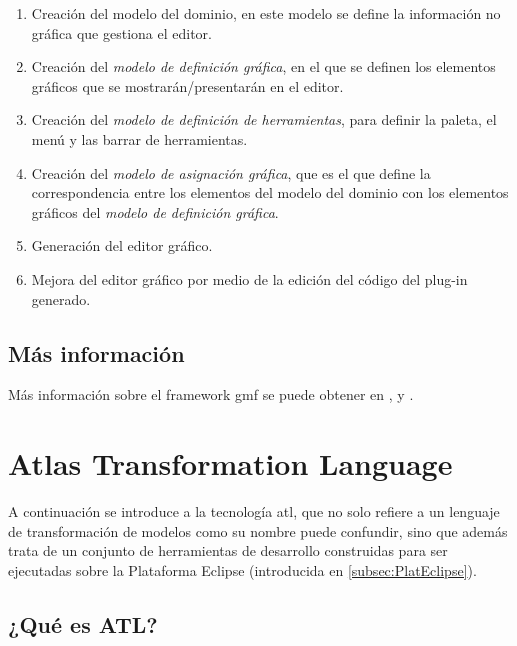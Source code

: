 \documentclass[a4paper,12pt,oneside,spanish]{book}
\begin{document}
\begin{enumerate}


\item Creación del modelo del dominio, en este modelo se define la información no gráfica  que gestiona el editor.

\item Creación del \textit{modelo de definición gráfica}, en el que se definen los elementos gráficos que se mostrarán/presentarán en el editor.

\item Creación del \textit{modelo de definición de herramientas}, para definir la paleta, el menú y las barrar de herramientas.

\item Creación del \textit{modelo de asignación gráfica}, que es el que define la correspondencia entre los elementos del modelo del dominio con los elementos gráficos del \textit{modelo de definición gráfica}.

\item Generación del editor gráfico.

\item Mejora del editor gráfico por medio de la edición del código del plug-in generado.

\end{enumerate}


\subsection{Más información}

Más información sobre el framework \gls{gmf} se puede obtener en \cite{GMP}, \cite{IntroGMFRuntime} y \cite{GMFTutorial}.


\section{Atlas Transformation Language}

A continuación se introduce a la tecnología \gls{atl}, que no solo refiere a un lenguaje de transformación de modelos como su nombre puede confundir, sino que además trata de un conjunto de herramientas de desarrollo construidas para ser ejecutadas sobre la Plataforma \textsf{Eclipse} (introducida en \ref{subsec:PlatEclipse}).


\subsection{¿Qué es ATL?}
\end{document}

